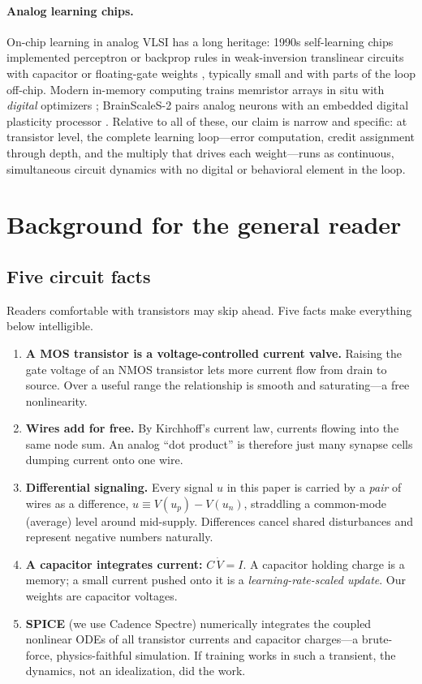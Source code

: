 \documentclass[11pt]{article}
\begin{document}
\paragraph{Analog learning chips.} On-chip learning in analog VLSI has a long heritage: 1990s self-learning chips implemented perceptron or backprop rules in weak-inversion translinear circuits with capacitor or floating-gate weights \cite{cauwenberghs1996}, typically small and with parts of the loop off-chip. Modern in-memory computing trains memristor arrays in situ with \emph{digital} optimizers \cite{yao2020}; BrainScaleS-2 pairs analog neurons with an embedded digital plasticity processor \cite{pehle2022}. Relative to all of these, our claim is narrow and specific: at transistor level, the complete learning loop---error computation, credit assignment through depth, and the multiply that drives each weight---runs as continuous, simultaneous circuit dynamics with no digital or behavioral element in the loop.

\section{Background for the general reader}
\label{sec:background}

\subsection{Five circuit facts}
\label{sec:primer}

Readers comfortable with transistors may skip ahead. Five facts make everything below intelligible.

\begin{enumerate}
\item \textbf{A MOS transistor is a voltage-controlled current valve.} Raising the gate voltage of an NMOS transistor lets more current flow from drain to source. Over a useful range the relationship is smooth and saturating---a free nonlinearity.
\item \textbf{Wires add for free.} By Kirchhoff's current law, currents flowing into the same node sum. An analog ``dot product'' is therefore just many synapse cells dumping current onto one wire.
\item \textbf{Differential signaling.} Every signal $u$ in this paper is carried by a \emph{pair} of wires as a difference, $u \equiv V(u_p)-V(u_n)$, straddling a common-mode (average) level around mid-supply. Differences cancel shared disturbances and represent negative numbers naturally.
\item \textbf{A capacitor integrates current: } $C\,\dot V = I$. A capacitor holding charge is a memory; a small current pushed onto it is a \emph{learning-rate-scaled update}. Our weights are capacitor voltages.
\item \textbf{SPICE} (we use Cadence Spectre) numerically integrates the coupled nonlinear ODEs of all transistor currents and capacitor charges---a brute-force, physics-faithful simulation. If training works in such a transient, the dynamics, not an idealization, did the work.
\end{enumerate}
\end{document}
